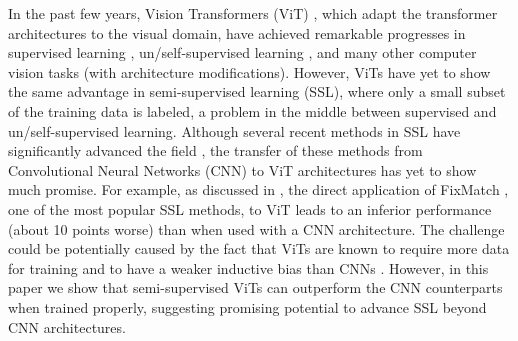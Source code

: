 \documentclass{article}
\begin{document}
In the past few years, Vision Transformers (ViT) \cite{DBLP:conf/iclr/DosovitskiyB0WZ21}, which adapt the transformer architectures \cite{DBLP:conf/nips/VaswaniSPUJGKP17} to the visual domain, have achieved remarkable progresses in supervised learning \cite{DBLP:conf/icml/TouvronCDMSJ21,DBLP:conf/iccv/LiuL00W0LG21,DBLP:conf/iccv/XuXCT21}, un/self-supervised learning \cite{DBLP:conf/iccv/ChenXH21,DBLP:conf/iccv/CaronTMJMBJ21,he2021masked}, and many other computer vision tasks \cite{DBLP:conf/eccv/CarionMSUKZ20,DBLP:conf/iccv/0001XMLYMF21,DBLP:conf/iccv/Arnab0H0LS21,DBLP:conf/iccv/StrudelPLS21} (with architecture modifications).
However, ViTs have yet to show the same advantage in semi-supervised learning (SSL), where only a small subset of the training data is labeled, a problem in the middle between supervised and un/self-supervised learning.
Although several recent methods in SSL have significantly advanced the field \cite{DBLP:conf/iclr/LaineA17,DBLP:conf/nips/TarvainenV17,DBLP:conf/nips/BerthelotCGPOR19,DBLP:conf/nips/SohnBCZZRCKL20,DBLP:conf/nips/XieDHL020,DBLP:conf/cvpr/CaiRMFTS21,DBLP:conf/cvpr/PhamDXL21}, the transfer of these methods from Convolutional Neural Networks (CNN) to ViT architectures has yet to show much promise. 
For example, as discussed in \cite{weng2021semi}, the direct application of FixMatch \cite{DBLP:conf/nips/SohnBCZZRCKL20}, one of the most popular SSL methods, to ViT leads to an inferior performance (about 10 points worse) than when used with a CNN architecture. The challenge could be potentially caused by the fact that ViTs are known to require more data for training and to have a weaker inductive bias than CNNs \cite{DBLP:conf/iclr/DosovitskiyB0WZ21}. However, in this paper we show that semi-supervised ViTs can outperform the CNN counterparts when trained properly, suggesting promising potential to advance SSL beyond CNN architectures. 
\end{document}
